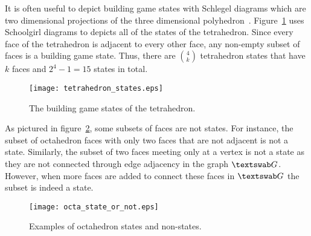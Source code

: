 It is often useful to depict building game states with Schlegel diagrams which are two dimensional projections of the three dimensional polyhedron~\cite{Sommerville1929}. Figure~\ref{fig:TetraStates} uses Schoolgirl diagrams to depicts all of the states of the tetrahedron. Since every face of the tetrahedron is adjacent to every other face, any non-empty subset of faces is a building game state. Thus, there are ${4 \choose k}$ tetrahedron states that have $k$ faces and $2^4 - 1 = 15$ states in total. 
\begin{figure}[ht]
  \texttt{[image: tetrahedron\_states.eps]}
\caption{The building game states of the tetrahedron.}
\label{fig:TetraStates}
\end{figure}
As pictured in figure~\ref{fig:OctaStates}, some subsets of faces are not states. For instance, the subset of octahedron faces with only two faces that are not adjacent is not a state. Similarly, the subset of two faces meeting only at a vertex is not a state as they are not connected through edge adjacency in the graph $\PolyGraph$. However, when more faces are added to connect these faces in $\PolyGraph$ the subset is indeed a state.

\begin{figure}[ht]
  \texttt{[image: octa\_state\_or\_not.eps]}
\caption{Examples of octahedron states and non-states.}
\label{fig:OctaStates}
\end{figure}
 


 




